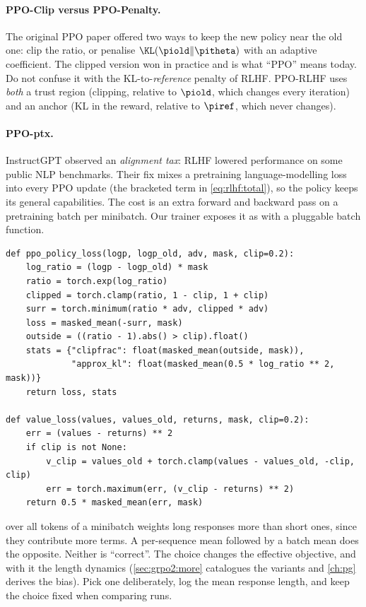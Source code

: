 \paragraph{PPO-Clip versus PPO-Penalty.} The original PPO paper offered two ways to keep the new policy near
the old one: clip the ratio, or penalise $\KL(\piold\|\pitheta)$ with an adaptive coefficient. The
clipped version won in practice and is what ``PPO'' means today. Do not confuse it with the
KL-to-\emph{reference} penalty of RLHF. PPO-RLHF uses \emph{both} a trust region (clipping,
relative to $\piold$, which changes every iteration) and an anchor (KL in the reward, relative to
$\piref$, which never changes).

\paragraph{PPO-ptx.} InstructGPT observed an \emph{alignment tax}: RLHF lowered performance on some
public NLP benchmarks. Their fix mixes a pretraining language-modelling loss into every PPO update
(the bracketed term in \cref{eq:rlhf:total}), so the policy keeps its general capabilities. The cost is an extra
forward and backward pass on a pretraining batch per minibatch. Our trainer exposes it as
 with a pluggable batch function.

\begin{lstlisting}[caption={Clipped policy loss and clipped value loss (\ident{llmsys/rlhf/losses.py}).},label={lst:rlhf:losses}]
def ppo_policy_loss(logp, logp_old, adv, mask, clip=0.2):
    log_ratio = (logp - logp_old) * mask
    ratio = torch.exp(log_ratio)
    clipped = torch.clamp(ratio, 1 - clip, 1 + clip)
    surr = torch.minimum(ratio * adv, clipped * adv)
    loss = masked_mean(-surr, mask)
    outside = ((ratio - 1).abs() > clip).float()
    stats = {"clipfrac": float(masked_mean(outside, mask)),
             "approx_kl": float(masked_mean(0.5 * log_ratio ** 2, mask))}
    return loss, stats

def value_loss(values, values_old, returns, mask, clip=0.2):
    err = (values - returns) ** 2
    if clip is not None:
        v_clip = values_old + torch.clamp(values - values_old, -clip, clip)
        err = torch.maximum(err, (v_clip - returns) ** 2)
    return 0.5 * masked_mean(err, mask)
\end{lstlisting}

\begin{pitfall}
 over all tokens of a minibatch weights long responses more than short ones,
since they contribute more terms. A per-sequence mean followed by a batch mean does the opposite.
Neither is ``correct''. The choice changes the effective objective, and with it the length
dynamics (\cref{sec:grpo2:more} catalogues the variants and \cref{ch:pg} derives the bias).
Pick one deliberately, log the mean response length, and keep the choice fixed when comparing
runs.
\end{pitfall}

